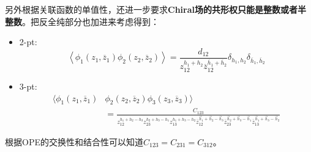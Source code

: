 另外根据关联函数的单值性，还进一步要求\textbf{Chiral场的共形权只能是整数或者半整数}。把反全纯部分也加进来考虑得到：
\begin{itemize}
	\item 2-pt:
	\begin{equation}
		\left\langle\phi_1(z_1,\overline{z}_1)\phi_2(z_2,\overline{z}_2)\right\rangle=\frac{d_{12}}{z_{12}^{h_1+h_2}\overline{z}_{12}^{\overline{h}_1+\overline{h}_2}}\delta_{h_1,h_2}\delta_{\overline{h}_1,\overline{h}_2}
	\end{equation}
	\item 3-pt:
	\begin{equation}
		\begin{aligned}\big\langle\phi_1(z_1,\overline{z}_1)&\phi_2(z_2,\overline{z}_2)\phi_3(z_3,\overline{z}_3)\big\rangle\\&=\frac{C_{123}}{z_{12}^{h_1+h_2-h_3}z_{23}^{h_2+h_3-h_1}z_{13}^{h_1+h_3-h_2}\overline{z}_{12}^{\vec{h}_1+\vec{h}_2-\vec{h}_3}\overline{z}_{23}^{\vec{h}_2+\vec{h}_3-\vec{h}_1}\overline{z}_{13}^{\vec{h}_1+\vec{h}_3-\vec{h}_2} }\end{aligned}
	\end{equation}
\end{itemize}
根据OPE的交换性和结合性可以知道$C_{123}=C_{231}=C_{312}$。

